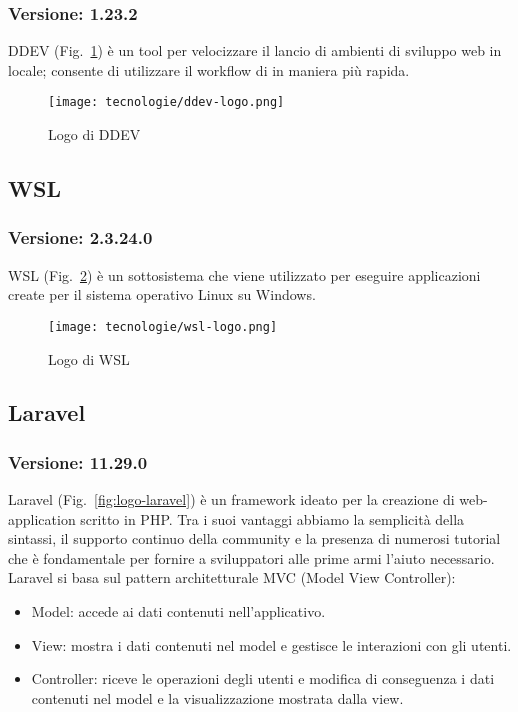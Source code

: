 \subsubsection{Versione: 1.23.2}
DDEV (Fig.~\ref{fig:logo-ddev}) è un tool per velocizzare il lancio di ambienti di sviluppo web in locale; consente di utilizzare il workflow di  in maniera più rapida.

\begin{figure}[!h] 
  \centering 
  \texttt{[image: tecnologie/ddev-logo.png]} 
  \caption{Logo di DDEV}
  \label{fig:logo-ddev}
\end{figure}

\newpage

\subsection{\label{tec:wsl}WSL}
\subsubsection{Versione: 2.3.24.0}
WSL (Fig.~\ref{fig:logo-wsl}) è un sottosistema che viene utilizzato per eseguire applicazioni create per il sistema operativo Linux su Windows.

\begin{figure}[!h] 
  \centering 
  \texttt{[image: tecnologie/wsl-logo.png]} 
  \caption{Logo di WSL}
  \label{fig:logo-wsl}
\end{figure}

\subsection{\label{tec:Laravel}Laravel}
\subsubsection{Versione: 11.29.0}
Laravel (Fig.~\ref{fig:logo-laravel}) è un framework ideato per la creazione di web-application scritto in PHP.
Tra i suoi vantaggi abbiamo la semplicità della sintassi, il supporto continuo della community e la presenza di numerosi tutorial che è fondamentale per fornire a sviluppatori alle prime armi l'aiuto necessario.
Laravel si basa sul pattern architetturale MVC (Model View Controller):
\begin{itemize}
  \item Model: accede ai dati contenuti nell'applicativo.
  \item View: mostra i dati contenuti nel model e gestisce le interazioni con gli utenti.  
  \item Controller: riceve le operazioni degli utenti e modifica di conseguenza i dati contenuti nel model e la visualizzazione mostrata dalla view.
\end{itemize}

